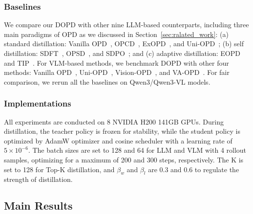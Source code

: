 \documentclass[]{jingdong}
\theoremstyle{plain}
\theoremstyle{definition}
\theoremstyle{remark}
\begin{document}
\subsubsection{Baselines} We compare our DOPD with other nine LLM-based counterparts, including three main paradigms of OPD as we discussed in Section~\ref{sec:ralated_work}: (a) standard distillation: Vanilla OPD~\citep{thinking2025opd}, OPCD~\citep{ye2026policy}, ExOPD~\citep{yang2026learning}, and Uni-OPD~\citep{hou2026uni}; (b) self distillation: SDFT~\citep{shenfeld2026self}, OPSD~\citep{zhao2026self}, and SDPO~\citep{hubotter2026reinforcement}; and (c) adaptive distillation: EOPD~\citep{jin2026entropy} and TIP~\citep{xu2026tip}.
For VLM-based methods, we benchmark DOPD with other four methods: Vanilla OPD~\citep{thinking2025opd}, Uni-OPD~\citep{hou2026uni}, Vision-OPD~\citep{yuan2026vision}, and VA-OPD~\citep{liu2026visual}. For fair comparison, we rerun all the baselines on Qwen3/Qwen3-VL models.



\subsubsection{Implementations} All experiments are conducted on 8 NVIDIA H200 141GB GPUs. During distillation, the teacher policy is frozen for stability, while the student policy is optimized by AdamW optimizer and cosine scheduler with a learning rate of $5\times10^{-6}$. The batch sizes are set to 128 and 64 for LLM and VLM with 4 rollout samples, optimizing for a maximum of 200 and 300 steps, respectively.
The K is set to 128 for Top-K distillation, and $\beta_{w}$ and $\beta_{l}$ are 0.3 and 0.6 to regulate the strength of distillation. 



\subsection{Main Results}
\end{document}
